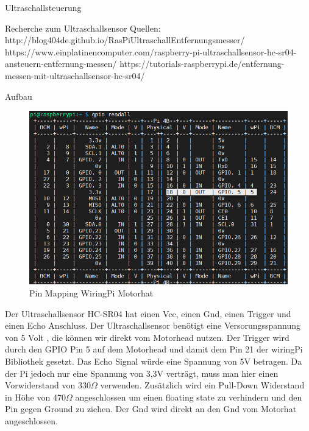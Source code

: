 \documentclass[12pt,twoside]{report}
\begin{document}
\begin{section}{Ultraschallsteuerung}
    \begin{subsection}{Recherche zum Ultraschallsensor}
        Quellen:
        http://blog404de.github.io/RasPiUltraschallEntfernungsmesser/
        https://www.einplatinencomputer.com/raspberry-pi-ultraschallsensor-hc-sr04-ansteuern-entfernung-messen/
        https://tutorials-raspberrypi.de/entfernung-messen-mit-ultraschallsensor-hc-sr04/
    \end{subsection}
    \begin{subsection}{Aufbau}

        \begin{figure}[h!]
              \includegraphics[width=\linewidth]{lernportfolio_assets/GPIO_Pins}
              \caption{Pin Mapping WiringPi Motorhat}
              \label{fig:boat1}
        \end{figure}
        Der Ultraschallsensor HC-SR04 hat einen Vcc, einen Gnd, einen Trigger und einen Echo Anschluss.
        Der Ultraschallsensor benötigt eine Versorungsspannung von 5 Volt , die können wir direkt vom Motorhead nutzen.
        Der Trigger wird durch den GPIO Pin 5 auf dem Motorhead und damit dem Pin 21 der wiringPi Bibliothek gesetzt.
        Das Echo Signal würde eine Spannung von 5V betragen. Da der Pi jedoch nur eine Spannung von 3,3V verträgt, muss man hier einen Vorwiderstand von 330$\Omega$ verwenden. Zusätzlich wird ein Pull-Down Widerstand in Höhe von 470$\Omega$ angeschlossen um einen floating state zu verhindern und den Pin gegen Ground zu ziehen.
        Der Gnd wird direkt an den Gnd vom Motorhat angeschlossen.


\end{subsection}
\end{section}
\end{document}
